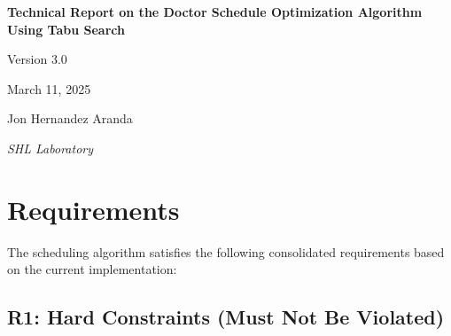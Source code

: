 \documentclass[12pt]{article}
\begin{document}
\begin{titlepage}
    \centering
    \vspace*{1cm}
    
    {\huge \bfseries Technical Report on the Doctor Schedule Optimization Algorithm Using Tabu Search\par}
    \vspace{1cm}
    {\Large Version 3.0\par}
    \vspace{1cm}
    {\Large March 11, 2025\par}
    \vspace{2cm}
    
    {\Large Jon Hernandez Aranda\par}
    \vspace{1cm}
    
    \begin{abstract}
        This report documents the requirements and Tabu Search formulation for the hospital schedule optimization algorithm implemented in Python. The system generates both full-year schedules and monthly schedules that satisfy multiple constraints including complete daily shift coverage, fair workload distribution, proper rest periods, and appropriate weekend/holiday assignments. The optimization algorithm accommodates varying seniority levels, with senior doctors working fewer hours than junior doctors. The implementation uses a tabu search metaheuristic with weighted penalties and a hierarchical evaluation framework to efficiently explore the solution space, supported by a meta-optimizer that searches for optimal weight configurations.
    \end{abstract}
    
    \vfill
    {\large \textit{SHL Laboratory}\par}
    
\end{titlepage}

\section{Requirements}

The scheduling algorithm satisfies the following consolidated requirements based on the current implementation:

\subsection*{R1: Hard Constraints (Must Not Be Violated)}
\end{document}
